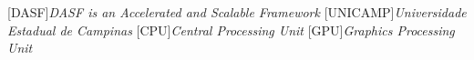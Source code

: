 [DASF]{\emph{DASF is an Accelerated and Scalable Framework}}
[UNICAMP]{\emph{Universidade Estadual de Campinas}}
[CPU]{\emph{Central Processing Unit}}
[GPU]{\emph{Graphics Processing Unit}}
